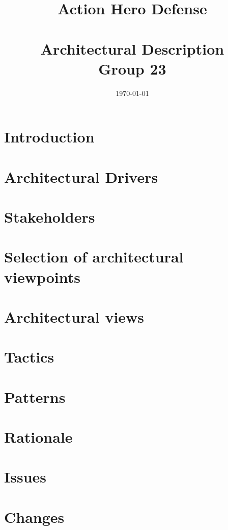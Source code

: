 \documentclass[a4paper, 11pt]{article}
\title{\textbf{Action Hero Defense}\\\HRule\\Architectural Description\\ Group 23}
\author{\and Håvard Geithus
	\and  Sondre Løberg Sæter 
	\and Nicolai Meltveit 
	\and Hallvard Andreas Eriksen 
	\and  Håkon Drolsum Røkenes}
\date{\today}
\begin{document}

\renewcommand\thepage{}

\tableofcontents
\clearpage
\listoffigures
\clearpage

\renewcommand\thepage{\arabic{page}}
\setcounter{page}{1}
\section{Introduction}


\section{Architectural Drivers}

\section{Stakeholders}

\section{Selection of architectural viewpoints}

\section{Architectural views}

\section{Tactics}

\section{Patterns}

\section{Rationale}

\section{Issues}

\section{Changes}

\end{document}
